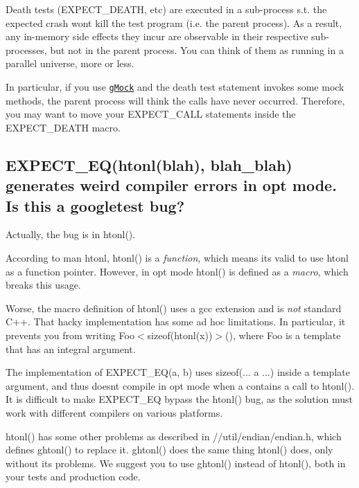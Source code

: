Death tests ({\ttfamily E\+X\+P\+E\+C\+T\+\_\+\+D\+E\+A\+TH}, etc) are executed in a sub-\/process s.\+t. the expected crash won\textquotesingle{}t kill the test program (i.\+e. the parent process). As a result, any in-\/memory side effects they incur are observable in their respective sub-\/processes, but not in the parent process. You can think of them as running in a parallel universe, more or less.

In particular, if you use \href{../../googlemock}{\tt g\+Mock} and the death test statement invokes some mock methods, the parent process will think the calls have never occurred. Therefore, you may want to move your {\ttfamily E\+X\+P\+E\+C\+T\+\_\+\+C\+A\+LL} statements inside the {\ttfamily E\+X\+P\+E\+C\+T\+\_\+\+D\+E\+A\+TH} macro.

\subsection*{E\+X\+P\+E\+C\+T\+\_\+\+E\+Q(htonl(blah), blah\+\_\+blah) generates weird compiler errors in opt mode. Is this a googletest bug?}

Actually, the bug is in {\ttfamily htonl()}.

According to {\ttfamily \textquotesingle{}man htonl\textquotesingle{}}, {\ttfamily htonl()} is a {\itshape function}, which means it\textquotesingle{}s valid to use {\ttfamily htonl} as a function pointer. However, in opt mode {\ttfamily htonl()} is defined as a {\itshape macro}, which breaks this usage.

Worse, the macro definition of {\ttfamily htonl()} uses a {\ttfamily gcc} extension and is {\itshape not} standard C++. That hacky implementation has some ad hoc limitations. In particular, it prevents you from writing {\ttfamily Foo$<$sizeof(htonl(x))$>$()}, where {\ttfamily Foo} is a template that has an integral argument.

The implementation of {\ttfamily E\+X\+P\+E\+C\+T\+\_\+\+E\+Q(a, b)} uses {\ttfamily sizeof(... a ...)} inside a template argument, and thus doesn\textquotesingle{}t compile in opt mode when {\ttfamily a} contains a call to {\ttfamily htonl()}. It is difficult to make {\ttfamily E\+X\+P\+E\+C\+T\+\_\+\+EQ} bypass the {\ttfamily htonl()} bug, as the solution must work with different compilers on various platforms.

{\ttfamily htonl()} has some other problems as described in {\ttfamily //util/endian/endian.h}, which defines {\ttfamily ghtonl()} to replace it. {\ttfamily ghtonl()} does the same thing {\ttfamily htonl()} does, only without its problems. We suggest you to use {\ttfamily ghtonl()} instead of {\ttfamily htonl()}, both in your tests and production code.

